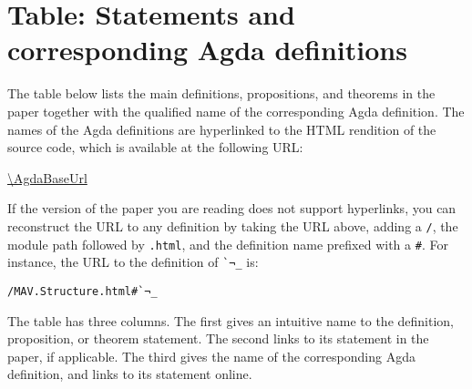 \section{Table: Statements and corresponding Agda definitions}
\label{sec:table-of-statments}

The table below lists the main definitions, propositions, and theorems in the paper together with the qualified name of the corresponding Agda definition.
The names of the Agda definitions are hyperlinked to the HTML rendition of the source code, which is available at the following URL:
\begin{center}
  \url{\AgdaBaseUrl}
\end{center}
If the version of the paper you are reading does not support hyperlinks, you can reconstruct the URL to any definition by taking the URL above, adding a \texttt{/}, the module path followed by \texttt{.html}, and the definition name prefixed with a \texttt{\#}.
For instance, the URL to the definition of \texttt{\`{}¬\_} is:
\begin{center}
  \texttt{\AgdaBaseUrl/MAV.Structure.html\#\`{}¬\_}
\end{center}
The table has three columns.
The first gives an intuitive name to the definition, proposition, or theorem statement.
The second links to its statement in the paper, if applicable.
The third gives the name of the corresponding Agda definition, and links to its statement online.
\vspace*{2ex}
